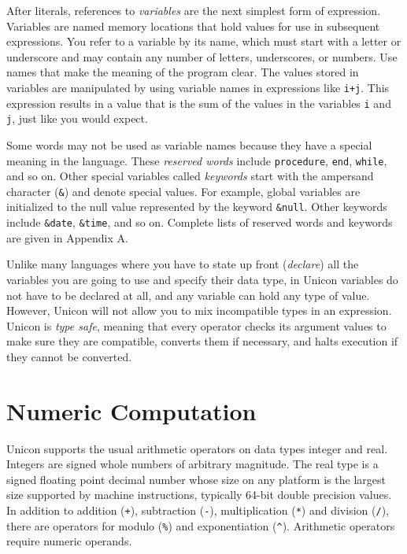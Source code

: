 After literals, references to
\textit{variable}\textit{s} are the next simplest form
of expression. Variables are named memory locations that hold values
for use in subsequent expressions. You refer to a variable by its name,
which must start with a letter or underscore and may contain any number
of letters, underscores, or numbers. Use names that make the meaning of
the program clear. The values stored in variables are manipulated by
using variable names in expressions like \texttt{i+j}. This expression
results in a value that is the sum of the values in the variables
\texttt{i} and \texttt{j}, just like you would expect.

Some words may not be used as variable names because they have a special
meaning in the language. These \textit{reserved
words} include \texttt{procedure}, \texttt{end},
\texttt{while}, and so on. Other special variables called
\textit{keywords} start with the ampersand
character (\texttt{\&}) and denote special values. For example, global
variables are initialized to the null value represented by the keyword
\texttt{\&null}. Other keywords
include \texttt{\&date}, \texttt{\&time}, and so on.
Complete lists of reserved words and keywords are given in Appendix A.

Unlike many languages where you have to state up front
(\textit{declare}) all the variables you are going to use\textit{ }and
specify their data type, in Unicon variables do not have to be declared
at all, and any variable can hold any type of value. However, Unicon
will not allow you to mix incompatible types in an expression. Unicon
is \textit{type safe}, meaning that every operator
checks its argument values to make sure they are compatible, converts
them if necessary, and halts execution if they cannot be converted.

\section{Numeric Computation}

Unicon supports the usual arithmetic operators on
data types integer and real. Integers are
signed whole numbers of arbitrary magnitude. The real type is a signed
floating point decimal number whose size on any
platform is the largest size supported by machine instructions,
typically 64-bit double precision values. In addition to
addition (\texttt{+}), subtraction
(\texttt{{}-}), multiplication (\texttt{*}) and
division (\texttt{/}), there are operators for
modulo (\texttt{\%}) and exponentiation (\texttt{\^{}}). Arithmetic operators require
numeric operands.

